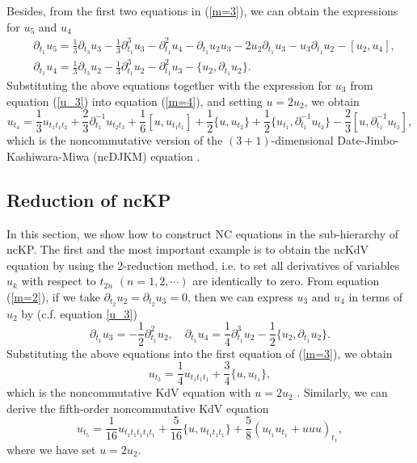 \documentclass[11p,reqno]{amsart}
\numberwithin{equation}{section}
\numberwithin{equation}{section}
\begin{document}
Besides, from the first two equations in (\ref{m=3}), we can obtain the expressions for $u_5$ and $u_4$
\begin{equation}
    \begin{split}
        &\partial_{t_1} u_5 = \frac{1}{3} \partial_{t_3} u_3 - \frac{1}{3} \partial_{t_1}^3 u_3 - \partial_{t_1}^2 u_4 - \partial_{t_1} u_2 u_3 - 2 u_2 \partial_{t_1} u_3 - u_3 \partial_{t_1} u_2 - [u_2, u_4], \\ 
        &\partial_{t_1} u_4 = \frac{1}{3} \partial_{t_3} u_2 - \frac{1}{3} \partial_{t_1}^3 u_2 - \partial_{t_1}^2 u_3 - \{u_2, \partial_{t_1} u_2\}.
    \end{split}
\end{equation} 
Substituting the above equations together with the expression for $u_3$ from equation (\ref{u_3}) into equation (\ref{m=4}), and setting $u = 2u_2$, we obtain
\begin{equation} \label{ncJM}
    u_{t_4} = \frac{1}{3} u_{t_1t_1t_2} + \frac{2}{3} \partial_{t_1}^{-1} u_{t_2t_3} + \frac{1}{6} [u, u_{t_1t_1}] + \frac{1}{2} \{u, u_{t_2}\} + \frac{1}{2} \{u_{t_1}, \partial_{t_1}^{-1} u_{t_2}\} - \frac{2}{3} [u, \partial_{t_1}^{-1} u_{t_3}], 
\end{equation}
which is the noncommutative version of the $(3 + 1)$-dimensional Date-Jimbo-Kashiwara-Miwa (ncDJKM) equation \cite{jimbo83}.  

\subsection{Reduction of ncKP}
In this section, we show how to construct NC equations in the sub-hierarchy of ncKP. 
The first and the most important example is to obtain the ncKdV equation by using the 2-reduction method, i.e. to set all derivatives of variables $u_k$ with respect to $t_{2n}$ $(n=1,2,\cdots)$ are identically to zero. From equation (\ref{m=2}), if we take $\partial_{t_2}u_2=\partial_{t_2}u_3=0$, then
we can express $u_3$ and $u_4$ in terms of $u_2$ by (c.f. equation \eqref{u_3})
\begin{equation}
    \partial_{t_1} u_3 = - \frac{1}{2} \partial_{t_1}^2 u_2, \quad \partial_{t_1} u_4 = \frac{1}{4} \partial_{t_1}^3 u_2 - \frac{1}{2} \{u_2, \partial_{t_1} u_2\}.
\end{equation}
Substituting the above equations into the first equation of (\ref{m=3}), we obtain
\begin{equation} \label{ncKdV}
    u_{t_3} = \frac{1}{4} u_{t_1t_1t_1} + \frac{3}{4} \{u, u_{t_1}\},
\end{equation} 
which is the noncommutative KdV equation with $u = 2u_2$ \cite{hamanaka05} .
Similarly, we can derive the fifth-order noncommutative KdV equation
\begin{equation}
    u_{t_5} = \frac{1}{16} u_{t_1t_1t_1t_1t_1} + \frac{5}{16} \{u, u_{t_1t_1t_1}\} + \frac{5}{8} (u_{t_1} u_{t_1} + u u u)_{t_1},
\end{equation}
where we have set $u = 2u_2$.
\end{document}
